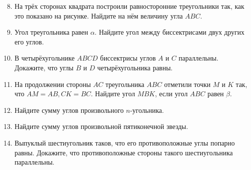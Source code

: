 \documentclass{article}
\begin{document}
	\begin{enumerate}[label*=\protect\fbox{\arabic{enumi}}]
		
		\setcounter{enumi}{7}
		
		\item На трёх сторонах квадрата построили равносторонние треугольники так, как это показано на рисунке. Найдите на нём величину угла $ABC$.
		
		\item Угол треугольника равен $\alpha$. Найдите угол между биссектрисами двух других его углов.
		
		\item В четырёхугольнике $ABCD$ биссектрисы углов $A$ и $C$ параллельны. Докажите, что углы $B$ и $D$ четырёхугольника равны.
		
		\item На продолжении стороны $AC$ треугольника $ABC$ отметили точки $M$ и $K$ так, что $AM = AB, CK = BC$. Найдите угол $MBK$, если угол $ABC$ равен $\beta$.
		
		\item Найдите сумму углов произвольного $n$-угольника.
		
		\item Найдите сумму углов произвольной пятиконечной звезды.
		
		\item Выпуклый шестиугольник таков, что его противоположные углы попарно равны. Докажите, что противоположные стороны такого шестиугольника параллельны.
		
	\end{enumerate}
\end{document}

